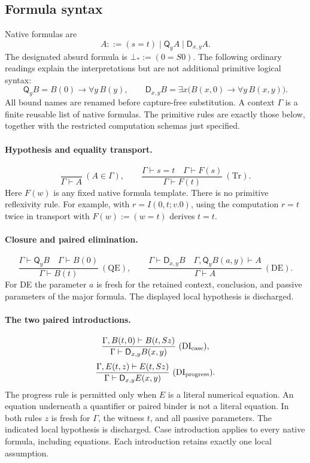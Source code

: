 \documentclass[11pt,letterpaper]{article}
\theoremstyle{definition}\newtheorem{definition}[theorem]{Definition}
\theoremstyle{remark}\newtheorem{remark}[theorem]{Remark}
\newcommand{\D}{\mathsf D}
\newcommand{\Q}{\mathsf Q}
\begin{document}
\subsection{Formula syntax}

Native formulas are
\[
 A ::= (s=t)\mid \Q_y A\mid \D_{x,y}A.
\]
The designated absurd formula is $\bot_*:=(0=S0)$. The following ordinary
readings explain the interpretations but are not additional primitive
logical syntax:
\[
 \Q_y B = B(0)\to\forall y\,B(y),\qquad
 \D_{x,y}B=\exists x\bigl(B(x,0)\to\forall y\,B(x,y)\bigr).
\]
All bound names are renamed before capture-free substitution. A context
$\Gamma$ is a finite reusable list of native formulas. The primitive
rules are exactly those below, together with the restricted computation
schemas just specified.

\paragraph{Hypothesis and equality transport.}
\[
 \frac{}{\Gamma\vdash A}\ (A\in\Gamma),
 \qquad
 \frac{\Gamma\vdash s=t\quad\Gamma\vdash F(s)}
      {\Gamma\vdash F(t)}\ (\mathrm{Tr}).
\]
Here $F(w)$ is any fixed native formula template. There is no primitive
reflexivity rule. For example, with $r=I(0,t;v.0)$, using the computation
$r=t$ twice in transport with $F(w):=(w=t)$ derives $t=t$.

\paragraph{Closure and paired elimination.}
\[
 \frac{\Gamma\vdash\Q_y B\quad\Gamma\vdash B(0)}
      {\Gamma\vdash B(t)}\ (\mathrm{QE}),
 \qquad
 \frac{\Gamma\vdash\D_{x,y}B\quad
       \Gamma,\Q_yB(a,y)\vdash A}
      {\Gamma\vdash A}\ (\mathrm{DE}).
\]
For DE the parameter $a$ is fresh for the retained context, conclusion,
and passive parameters of the major formula. The displayed local
hypothesis is discharged.

\paragraph{The two paired introductions.}
\begin{gather*}
 \frac{\Gamma,B(t,0)\vdash B(t,Sz)}
      {\Gamma\vdash\D_{x,y}B(x,y)}\ (\mathrm{DI}_{\rm case}),\\[3pt]
 \frac{\Gamma,E(t,z)\vdash E(t,Sz)}
      {\Gamma\vdash\D_{x,y}E(x,y)}\ (\mathrm{DI}_{\rm progress}).
\end{gather*}
The progress rule is permitted only when $E$ is a literal numerical
equation. An equation underneath a quantifier or paired binder is not
a literal equation. In both rules $z$ is fresh for $\Gamma$, the witness
$t$, and all passive parameters. The indicated local hypothesis is
discharged. Case introduction applies to every native formula, including
equations. Each introduction retains exactly one local assumption.
\end{document}
